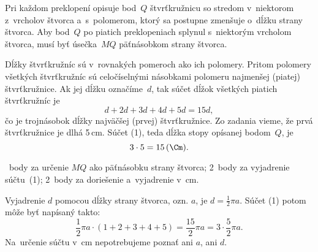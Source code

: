 {%
Pri každom preklopení opisuje bod~$Q$ štvrťkružnicu so stredom v~niektorom z~vrcholov štvorca a~s~polomerom, ktorý sa postupne zmenšuje o~dĺžku strany štvorca.
Aby bod~$Q$ po piatich preklopeniach splynul s~niektorým vrcholom štvorca, musí byť úsečka~$MQ$ päťnásobkom strany štvorca.
%


Dĺžky štvrťkružníc sú v~rovnakých pomeroch ako ich polomery.
Pritom polomery všetkých štvrťkružníc sú celočíselnými násobkami polomeru najmenšej (piatej) štvrťkružnice.
Ak jej dĺžku označíme~$d$, tak súčet dĺžok všetkých piatich štvrťkružníc je
$$
d+2d+3d+4d+5d=15d, \tag{1}
$$
čo je trojnásobok dĺžky najväčšej (prvej) štvrťkružnice.
Zo zadania vieme, že prvá štvrťkružnice je dlhá 5\,cm.
Súčet (1), teda dĺžka stopy opísanej bodom~$Q$, je
$$
3\cdot5=15\,(\Cm).
$$

~body za určenie $MQ$ ako päťnásobku strany štvorca;
2~body za vyjadrenie súčtu~(1);
2~body za doriešenie a~vyjadrenie v~cm.

\poznamka
Vyjadrenie $d$ pomocou dĺžky strany štvorca, ozn. $a$, je $d=\frac12\pi a$.
Súčet (1) potom môže byť napísaný takto:
$$
\frac12\pi a\cdot(1+2+3+4+5)=
\frac{15}2\pi a=3\cdot\frac52\pi a.
$$
Na~určenie súčtu v~cm nepotrebujeme poznať ani $a$, ani $d$.
\endhodnotenie
}

